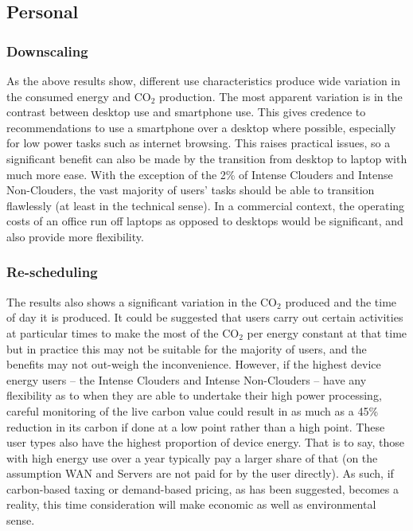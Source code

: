 \documentclass[conference]{IEEEtran}
\begin{document}
\subsection{Personal}

\subsubsection{Downscaling}

As the above results show, different use characteristics produce wide
variation in the consumed energy and CO$_2$ production. The most
apparent variation is in the contrast between desktop use and
smartphone use. This gives credence to recommendations to use a
smartphone over a desktop where possible, especially for low power
tasks such as internet browsing. This raises practical issues, so a
significant benefit can also be made by the transition from desktop to
laptop with much more ease. With the exception of the 2\% of Intense
Clouders and Intense Non-Clouders, the vast majority of users' tasks
should be able to transition flawlessly (at least in the technical
sense).
In a commercial context, the operating costs of an office run off
laptops as opposed to desktops would be significant, and also provide
more flexibility.

\subsubsection{Re-scheduling}

The results also shows a significant variation in the CO$_2$ produced
and the time of day it is produced. It could be suggested that users
carry out certain activities at particular times to make the most of
the CO$_2$ per energy constant at that time but in practice this may
not be suitable for the majority of users, and the benefits may not
out-weigh the inconvenience. However, if the highest device energy
users -- the Intense Clouders and Intense Non-Clouders -- have any
flexibility as to when they are able to undertake their high power
processing, careful monitoring of the live carbon value could result
in as much as a 45\% reduction in its carbon if done at a low point
rather than a high point. These user types also have the highest
proportion of device energy. That is to say, those with high energy
use over a year typically pay a larger share of that (on the
assumption WAN and Servers are not paid for by the user directly). As
such, if carbon-based taxing or demand-based pricing, as has been
suggested, becomes a reality, this time consideration will make
economic as well as environmental sense.
\end{document}
